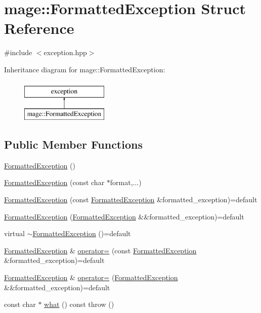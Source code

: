 \hypertarget{structmage_1_1_formatted_exception}{}\section{mage\+:\+:Formatted\+Exception Struct Reference}
\label{structmage_1_1_formatted_exception}


{\ttfamily \#include $<$exception.\+hpp$>$}

Inheritance diagram for mage\+:\+:Formatted\+Exception\+:\begin{figure}[H]
\begin{center}
\leavevmode
\includegraphics[height=2.000000cm]{structmage_1_1_formatted_exception}
\end{center}
\end{figure}
\subsection*{Public Member Functions}
\begin{DoxyCompactItemize}
\item 
\hyperlink{structmage_1_1_formatted_exception_a77b82a969ec33a3aacec74a5adc4ab8b}{Formatted\+Exception} ()
\item 
\hyperlink{structmage_1_1_formatted_exception_a3fe833a49052a2db99c023b1b1d43621}{Formatted\+Exception} (const char $\ast$format,...)
\item 
\hyperlink{structmage_1_1_formatted_exception_ac42aa4b8dcd15a4f88fc578fec5b11db}{Formatted\+Exception} (const \hyperlink{structmage_1_1_formatted_exception}{Formatted\+Exception} \&formatted\+\_\+exception)=default
\item 
\hyperlink{structmage_1_1_formatted_exception_ac47ff28101bb2660f40211d47afd6bf9}{Formatted\+Exception} (\hyperlink{structmage_1_1_formatted_exception}{Formatted\+Exception} \&\&formatted\+\_\+exception)=default
\item 
virtual \hyperlink{structmage_1_1_formatted_exception_a074a2e845b0fa0d57dfeab63ee0cb1f5}{$\sim$\+Formatted\+Exception} ()=default
\item 
\hyperlink{structmage_1_1_formatted_exception}{Formatted\+Exception} \& \hyperlink{structmage_1_1_formatted_exception_a36b95a1d6ee656db750f9f7c24a0f69d}{operator=} (const \hyperlink{structmage_1_1_formatted_exception}{Formatted\+Exception} \&formatted\+\_\+exception)=default
\item 
\hyperlink{structmage_1_1_formatted_exception}{Formatted\+Exception} \& \hyperlink{structmage_1_1_formatted_exception_ae35ad9e81efe8ed385792854036b4a14}{operator=} (\hyperlink{structmage_1_1_formatted_exception}{Formatted\+Exception} \&\&formatted\+\_\+exception)=default
\item 
const char $\ast$ \hyperlink{structmage_1_1_formatted_exception_aec9ca8402604df35b702e8d29672a3df}{what} () const  throw ()
\end{DoxyCompactItemize}
